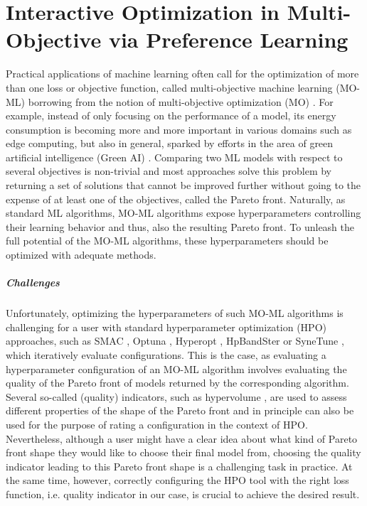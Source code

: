 \chapter{Interactive Optimization in Multi-Objective via Preference Learning}
\label{human-centric-chap:moo}

Practical applications of machine learning often call for the optimization of more than one loss or objective function, called multi-objective machine learning (MO-ML) \cite{jin-momlbook06a} borrowing from the notion of multi-objective optimization (MO) \cite{deb-ds16,gunantara-ce18}.
For example, instead of only focusing on the performance of a model, its energy consumption is becoming more and more important in various domains such as edge computing, but also in general, sparked by efforts in the area of green artificial intelligence (Green AI) \cite{schwartz-arxiv19a,wynsberghe-aiethics21a}.
Comparing two ML models with respect to several objectives is non-trivial and most approaches solve this problem by returning a set of solutions that cannot be improved further without going to the expense of at least one of the objectives, called the Pareto front.
Naturally, as standard ML algorithms, MO-ML algorithms expose hyperparameters controlling their learning behavior and thus, also the resulting Pareto front.
To unleash the full potential of the MO-ML algorithms, these hyperparameters should be optimized with adequate methods.

\paragraph{Challenges} Unfortunately, optimizing the hyperparameters of such MO-ML algorithms is challenging for a user with standard hyperparameter optimization (HPO) \cite{feurer-automlbook19a,bischl-dmkd23a} approaches, such as SMAC \cite{hutter-lion11a,lindauer-jmlr22a}, Optuna \cite{akiba-kdd19a}, Hyperopt \cite{komer-scipy14a}, HpBandSter \cite{falkner-icml18a} or SyneTune \cite{salinas-automl22}, which iteratively evaluate configurations.
This is the case, as evaluating a hyperparameter configuration of an MO-ML algorithm involves evaluating the quality of the Pareto front of models returned by the corresponding algorithm.
Several so-called (quality) indicators, such as hypervolume \cite{zitzler1999multiobjective}, are used to assess different properties of the shape of the Pareto front and in principle can also be used for the purpose of rating a configuration in the context of HPO.
Nevertheless, although a user might have a clear idea about what kind of Pareto front shape they would like to choose their final model from, choosing the quality indicator leading to this Pareto front shape is a challenging task in practice. At the same time, however, correctly configuring the HPO tool with the right loss function, i.e. quality indicator in our case, is crucial to achieve the desired result.

